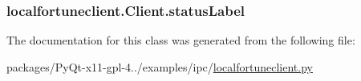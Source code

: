 \subsubsection[{status\+Label}]{\setlength{\rightskip}{0pt plus 5cm}localfortuneclient.\+Client.\+status\+Label}\label{classlocalfortuneclient_1_1Client_a9d3eaf1b95da533975f37a9d58410913}


The documentation for this class was generated from the following file\+:\begin{DoxyCompactItemize}
\item 
packages/\+Py\+Qt-\/x11-\/gpl-\/4../examples/ipc/\hyperlink{localfortuneclient_8py}{localfortuneclient.\+py}\end{DoxyCompactItemize}
